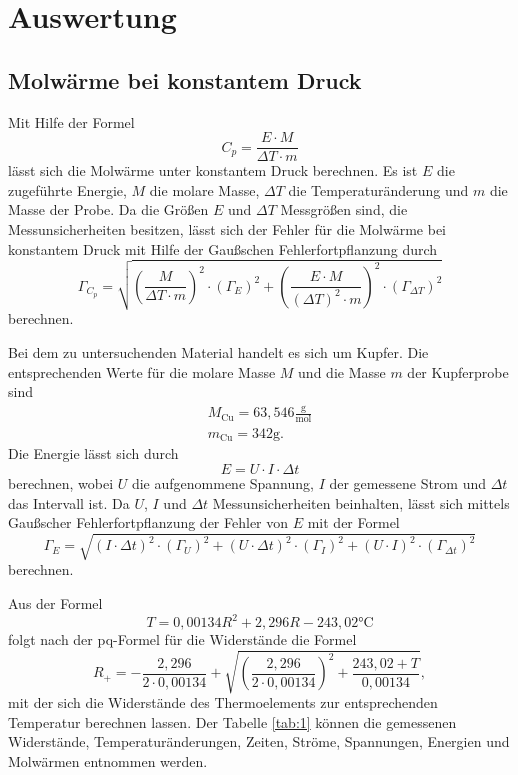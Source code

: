 \section{Auswertung}
\subsection{Molwärme bei konstantem Druck}
Mit Hilfe der Formel
\begin{equation}
  C_p = \frac{E \cdot M}{\Delta T \cdot m}
\end{equation}
lässt sich die Molwärme unter konstantem Druck berechnen.
Es ist $E$ die zugeführte Energie, $M$ die molare Masse, $\Delta T$ die Temperaturänderung und $m$ die Masse der Probe.
Da die Größen $E$ und $\Delta{T}$ Messgrößen sind, die Messunsicherheiten besitzen,
lässt sich der Fehler für die Molwärme bei konstantem Druck mit Hilfe der Gaußschen Fehlerfortpflanzung durch
\begin{equation}
  \Gamma_{C_p} = \sqrt{ (\frac{M}{\Delta{T}\cdot{m}})^2\cdot(\Gamma_E)^2 + (\frac{E\cdot{M}}{(\Delta{T})^2\cdot{m}})^2\cdot(\Gamma_{\Delta{T}})^2 }
\end{equation}
berechnen.

Bei dem zu untersuchenden Material handelt es sich um Kupfer.
Die entsprechenden Werte für die molare Masse $M$ \cite{cu} und die Masse $m$ der Kupferprobe \cite{skript} sind
\begin{gather*}
  M_{\text{Cu}} = 63,546\frac{\text{g}}{\text{mol}} \\
  m_{\text{Cu}} = 342\si{\gram}.
\end{gather*}
Die Energie lässt sich durch
\begin{equation}
  E = U\cdot I\cdot \Delta t
\end{equation}
berechnen, wobei $U$ die aufgenommene Spannung, $I$ der gemessene Strom und $\Delta t$ das Intervall ist.
Da $U$, $I$ und $\Delta{t}$ Messunsicherheiten beinhalten,
lässt sich mittels Gaußscher Fehlerfortpflanzung der Fehler von $E$ mit der Formel
\begin{equation}
  \Gamma_E = \sqrt{ (I\cdot\Delta{t})^2\cdot(\Gamma_U)^2 + (U\cdot\Delta{t})^2\cdot(\Gamma_I)^2 + (U\cdot{I})^2\cdot(\Gamma_{\Delta{t}})^2 }
\end{equation}
berechnen.

Aus der Formel
\begin{equation}
  T = 0,00134R^2 + 2,296R - 243,02\text{°C}
\end{equation}
folgt nach der pq-Formel für die Widerstände die Formel
\begin{equation}
  R_+ = -\frac{2,296}{2\cdot0,00134} + \sqrt{ \left(\frac{2,296}{2\cdot0,00134}\right)^2 + \frac{243,02 + T}{0,00134} },
  \end{equation}
mit der sich die Widerstände des Thermoelements zur entsprechenden Temperatur berechnen lassen.
Der Tabelle \ref{tab:1} können die gemessenen Widerstände, Temperaturänderungen, Zeiten, Ströme, Spannungen, Energien und Molwärmen entnommen werden.

